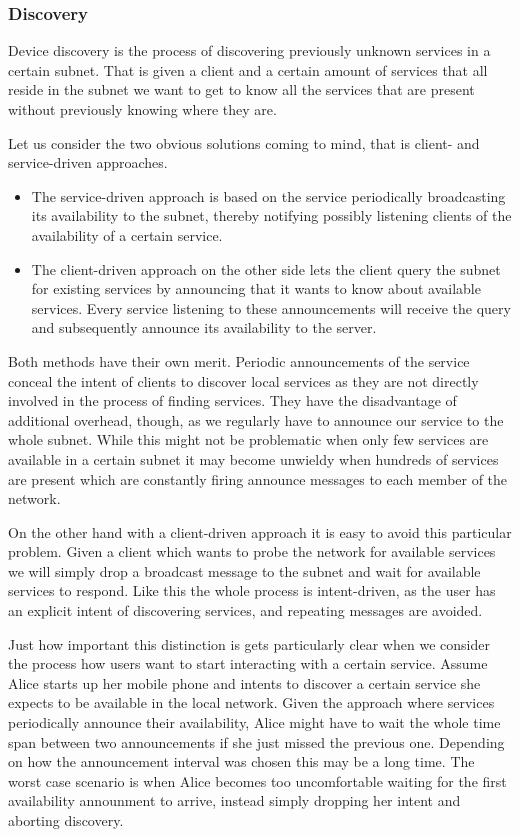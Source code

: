 \subsubsection{Discovery}

Device discovery is the process of discovering previously unknown services in a certain subnet.
That is given a client and a certain amount of services that all reside in the subnet we want to get to know all the services that are present without previously knowing where they are.

Let us consider the two obvious solutions coming to mind, that is client- and service-driven approaches.
\begin{itemize}
    \item The service-driven approach is based on the service periodically broadcasting its availability to the subnet, thereby notifying possibly listening clients of the availability of a certain service.
    \item The client-driven approach on the other side lets the client query the subnet for existing services by announcing that it wants to know about available services.
        Every service listening to these announcements will receive the query and subsequently announce its availability to the server.
\end{itemize}

Both methods have their own merit.
Periodic announcements of the service conceal the intent of clients to discover local services as they are not directly involved in the process of finding services.
They have the disadvantage of additional overhead, though, as we regularly have to announce our service to the whole subnet.
While this might not be problematic when only few services are available in a certain subnet it may become unwieldy when hundreds of services are present which are constantly firing announce messages to each member of the network.

On the other hand with a client-driven approach it is easy to avoid this particular problem.
Given a client which wants to probe the network for available services we will simply drop a broadcast message to the subnet and wait for available services to respond.
Like this the whole process is intent-driven, as the user has an explicit intent of discovering services, and repeating messages are avoided.

Just how important this distinction is gets particularly clear when we consider the process how users want to start interacting with a certain service.
Assume Alice starts up her mobile phone and intents to discover a certain service she expects to be available in the local network.
Given the approach where services periodically announce their availability, Alice might have to wait the whole time span between two announcements if she just missed the previous one.
Depending on how the announcement interval was chosen this may be a long time.
The worst case scenario is when Alice becomes too uncomfortable waiting for the first availability announment to arrive, instead simply dropping her intent and aborting discovery.

